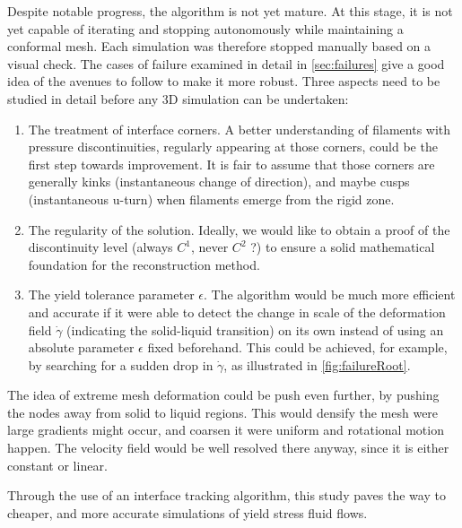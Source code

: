 \documentclass[11 pt]{report}
\begin{document}
Despite notable progress, the algorithm is not yet mature. At this stage, it is not yet capable of iterating and stopping autonomously while maintaining a conformal mesh. Each simulation was therefore stopped manually based on a visual check. The cases of failure examined in detail in \cref{sec:failures} give a good idea of the avenues to follow to make it more robust. Three aspects need to be studied in detail before any 3D simulation can be undertaken:
\begin{enumerate}
    \item The treatment of interface corners. A better understanding of filaments with pressure discontinuities, regularly appearing at those corners, could be the first step towards improvement. It is fair to assume that those corners are generally kinks (instantaneous change of direction), and maybe cusps (instantaneous u-turn) when filaments emerge from the rigid zone.
    \item The regularity of the solution. Ideally, we would like to obtain a proof of the discontinuity level (always $C^1$, never $C^2$ ?) to ensure a solid mathematical foundation for the reconstruction method.
    \item The yield tolerance parameter $\epsilon$. The algorithm would be much more efficient and accurate if it were able to detect the change in scale of the deformation field $\dot \gamma$ (indicating the solid-liquid transition) on its own instead of using an absolute parameter $\epsilon$ fixed beforehand. This could be achieved, for example, by searching for a sudden drop in $\dot \gamma$, as illustrated in \cref{fig:failureRoot}.
\end{enumerate}

The idea of extreme mesh deformation could be push even further, by pushing the nodes away from solid to liquid regions. This would densify the mesh were large gradients might occur, and coarsen it were uniform and rotational motion happen. The velocity field would be well resolved there anyway, since it is either constant or linear.

Through the use of an interface tracking algorithm, this study paves the way to cheaper, and more accurate simulations of yield stress fluid flows.






\end{document}
